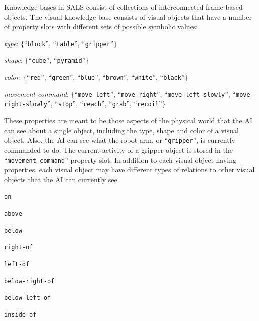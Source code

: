 Knowledge bases in SALS consist of collections of interconnected
frame-based objects.  The visual knowledge base consists of visual
objects that have a number of property slots with different sets of
possible symbolic values:
\begin{samepage}
  \begin{packed_itemize}
  \item{{\emph{type}}: $\{$``{\tt{block}}'', ``{\tt{table}}'', ``{\tt{gripper}}''$\}$}
  \item{{\emph{shape}}: $\{$``{\tt{cube}}'', ``{\tt{pyramid}}''$\}$}
  \item{{\emph{color}}: $\{$``{\tt{red}}'', ``{\tt{green}}'', ``{\tt{blue}}'', ``{\tt{brown}}'', ``{\tt{white}}'', ``{\tt{black}}''$\}$}
  \item{{\emph{movement-command}}: $\{$``{\tt{move-left}}'', ``{\tt{move-right}}'', ``{\tt{move-left-slowly}}'', ``{\tt{move-right-slowly}}'', ``{\tt{stop}}'', ``{\tt{reach}}'', ``{\tt{grab}}'', ``{\tt{recoil}}''$\}$}
  \end{packed_itemize}
\end{samepage}
These properties are meant to be those aspects of the physical world
that the AI can see about a single object, including the type, shape
and color of a visual object.  Also, the AI can see what the robot
arm, or ``{\tt{gripper}}'', is currently commanded to do.  The current
activity of a gripper object is stored in the
``{\tt{movement-command}}'' property slot.  In addition to each visual
object having properties, each visual object may have different types
of relations to other visual objects that the AI can currently see.

\begin{samepage}
  \begin{packed_itemize}
  \item{\tt{on}}
  \item{\tt{above}}
  \item{\tt{below}}
  \item{\tt{right-of}}
  \item{\tt{left-of}}
  \item{\tt{below-right-of}}
  \item{\tt{below-left-of}}
  \item{\tt{inside-of}}
  \end{packed_itemize}
\end{samepage}

